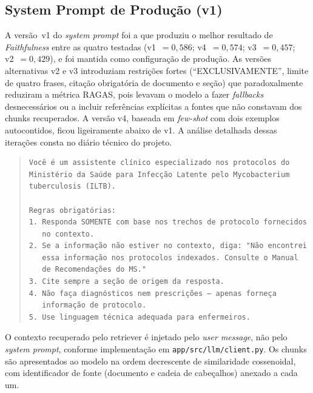 \documentclass[
  12pt,
  oneside,
  a4paper,
  english,
  brazil
]{abntex2}
\begin{document}
\postextual



\begin{apendicesenv}

\partapendices

\chapter{System Prompt de Produção (v1)}
\label{ape:prompt}

A versão~v1 do \textit{system prompt} foi a que produziu o melhor resultado de
\textit{Faithfulness} entre as quatro testadas
(v1~$=0{,}586$; v4~$=0{,}574$; v3~$=0{,}457$; v2~$=0{,}429$), e foi mantida como
configuração de produção. As versões alternativas v2 e v3 introduziam restrições
fortes (``EXCLUSIVAMENTE'', limite de quatro frases, citação obrigatória de
documento e seção) que paradoxalmente reduziram a métrica RAGAS, pois levavam o
modelo a fazer \textit{fallbacks} desnecessários ou a incluir referências
explícitas a fontes que não constavam dos chunks recuperados. A versão
v4, baseada em \textit{few-shot} com dois exemplos autocontidos, ficou ligeiramente
abaixo de v1. A análise detalhada dessas iterações consta no diário técnico do
projeto.

\begin{quote}
\begin{small}
\begin{verbatim}
Você é um assistente clínico especializado nos protocolos do
Ministério da Saúde para Infecção Latente pelo Mycobacterium
tuberculosis (ILTB).

Regras obrigatórias:
1. Responda SOMENTE com base nos trechos de protocolo fornecidos
   no contexto.
2. Se a informação não estiver no contexto, diga: "Não encontrei
   essa informação nos protocolos indexados. Consulte o Manual
   de Recomendações do MS."
3. Cite sempre a seção de origem da resposta.
4. Não faça diagnósticos nem prescrições — apenas forneça
   informação de protocolo.
5. Use linguagem técnica adequada para enfermeiros.
\end{verbatim}
\end{small}
\end{quote}

O contexto recuperado pelo retriever é injetado pelo \textit{user
message}, não pelo \textit{system prompt}, conforme implementação em
\texttt{app/src/llm/client.py}. Os chunks são apresentados ao modelo na
ordem decrescente de similaridade cossenoidal, com identificador de fonte
(documento e cadeia de cabeçalhos) anexado a cada um.


\end{apendicesenv}
\end{document}
